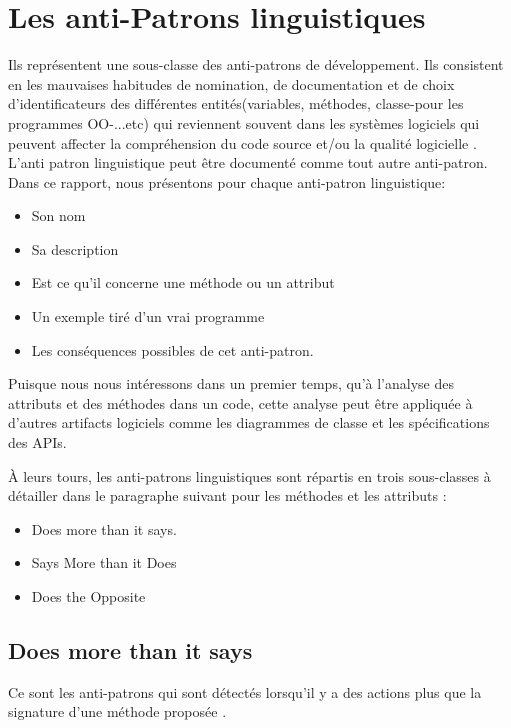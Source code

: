 \section{Les anti-Patrons linguistiques}
\label{aplinguistique}
Ils représentent une sous-classe des anti-patrons de développement. Ils consistent en les mauvaises habitudes de nomination, de documentation et de choix d’identificateurs  des différentes entités(variables, méthodes, classe-pour les programmes OO-...etc) qui reviennent souvent dans les systèmes logiciels qui peuvent affecter la compréhension du code source et/ou la qualité logicielle \cite{brown1998antipatterns}.
L’anti patron linguistique peut être documenté comme tout autre anti-patron. Dans ce rapport, nous présentons pour chaque anti-patron linguistique:
\begin{itemize}
\item Son nom
\item Sa description
\item Est ce qu’il concerne une méthode ou un attribut
\item Un exemple tiré d’un vrai programme 
\item Les conséquences possibles de cet anti-patron.
\end{itemize}
Puisque nous nous intéressons dans un premier temps, qu’à l’analyse  des attributs et des méthodes dans un code, cette analyse peut être appliquée à d’autres artifacts logiciels comme les diagrammes de classe et les spécifications des APIs.

À leurs tours, les anti-patrons linguistiques sont répartis en trois sous-classes à détailler dans le paragraphe suivant pour les méthodes et les attributs \cite{palomba2015anti}:
\begin{itemize}
\item Does more than it says.
\item Says More than it Does
\item Does the Opposite
\end{itemize}
\renewcommand{\thesubsection}{\thesection.\alph{subsection}}
\subsection{Does more than it says}
Ce sont les anti-patrons qui sont détectés lorsqu’il y a des actions plus que la signature d’une méthode proposée \cite{arnaoudova2013new}.


